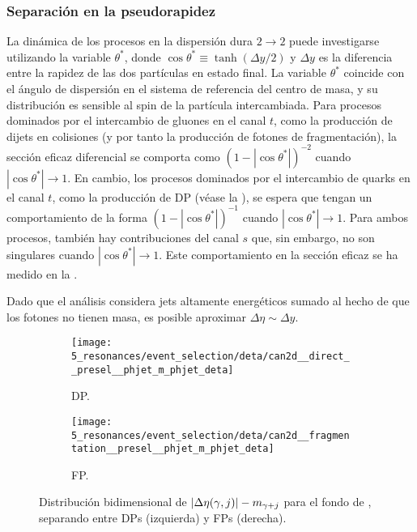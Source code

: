 \subsubsection{Separación en la pseudorapidez}
\label{subsubsec:evt_selection:sr_opt:eta:deta}


La dinámica de los procesos en la dispersión dura \(2 \to 2\) puede investigarse utilizando la variable \(\theta^*\), donde \(\cos\theta^* \equiv \tanh \left(\Delta y / 2\right)\) y \(\Delta y\) es la diferencia entre la rapidez de las dos partículas en estado final. La variable \(\theta^*\) coincide con el ángulo de dispersión en el sistema de referencia del centro de masa, y su distribución es sensible al spin de la partícula intercambiada. Para procesos dominados por el intercambio de gluones en el canal \(t\), como la producción de dijets en colisiones \pp (y por tanto la producción de fotones de fragmentación), la sección eficaz diferencial se comporta como \(\left(1 - \left|\cos \theta^*\right|\right)^{-2}\) cuando \(\left|\cos \theta^*\right| \to 1\). En cambio, los procesos dominados por el intercambio de quarks en el canal \(t\), como la producción de \ac{DP} (véase la \Fig{\ref{fig:theory:sm:prompt_photon:feynman_lo_direct}}), se espera que tengan un comportamiento de la forma \(\left(1 - \left|\cos \theta^*\right|\right)^{-1}\) cuando \(\left|\cos \theta^*\right| \to 1\). Para ambos procesos, también hay contribuciones del canal \(s\) que, sin embargo, no son singulares cuando \(\left|\cos \theta^*\right| \to 1\).
Este comportamiento en la sección eficaz se ha medido en la .

Dado que el análisis considera jets altamente energéticos sumado al hecho de que los fotones no tienen masa, es posible aproximar \(\Delta\eta \sim \Delta y\).

\begin{figure}[ht!]
    \centering
    \begin{subfigure}[h]{0.49\linewidth}
        \centering
        \texttt{[image: 5\_resonances/event\_selection/deta/can2d\_\_direct\_\_presel\_\_phjet\_m\_phjet\_deta]}
        \caption{\acf{DP}.}
        \label{fig:evt_selection:sr_opt:eta:deta:2d:direct}
    \end{subfigure}
    \hfill
    \begin{subfigure}[h]{0.49\linewidth}
        \centering
        \texttt{[image: 5\_resonances/event\_selection/deta/can2d\_\_fragmentation\_\_presel\_\_phjet\_m\_phjet\_deta]}
        \caption{\acf{FP}.}
        \label{fig:evt_selection:sr_opt:eta:deta:2d:frag}
    \end{subfigure}
    \caption{Distribución bidimensional de \(|\Delta\eta(\gamma, j)|-m_{\gamma+j}\) para el fondo de \gammajet, separando entre \acp{DP} (izquierda) y \acp{FP} (derecha).}
    \label{fig:evt_selection:sr_opt:eta:deta:2d}
\end{figure}


